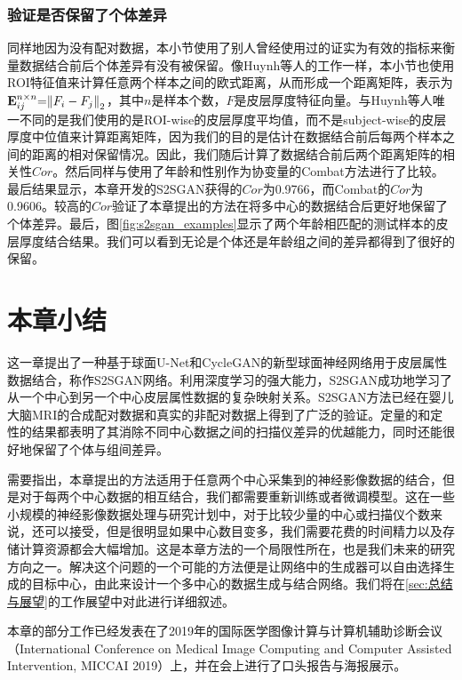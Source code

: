 \subsubsection{验证是否保留了个体差异}
同样地因为没有配对数据，本小节使用了别人曾经使用过的证实为有效的指标来衡量数据结合前后个体差异有没有被保留。像Huynh等人\cite{huynh2019multi}的工作一样，本小节也使用ROI特征值来计算任意两个样本之间的欧式距离，从而形成一个距离矩阵，表示为${\bf{E}}_{ij}^{n \times n}{\rm{ = }}{\left\| {{F_i} - {F_j}} \right\|_{\rm{2}}}$，其中$n$是样本个数，$F$是皮层厚度特征向量。与Huynh等人\cite{huynh2019multi}唯一不同的是我们使用的是ROI-wise的皮层厚度平均值，而不是subject-wise的皮层厚度中位值来计算距离矩阵，因为我们的目的是估计在数据结合前后每两个样本之间的距离的相对保留情况。因此，我们随后计算了数据结合前后两个距离矩阵的相关性$Cor$。然后同样与使用了年龄和性别作为协变量的Combat方法进行了比较。最后结果显示，本章开发的S2SGAN获得的$Cor$为0.9766，而Combat的$Cor$为0.9606。较高的$Cor$验证了本章提出的方法在将多中心的数据结合后更好地保留了个体差异。最后，图\ref{fig:s2sgan_examples}显示了两个年龄相匹配的测试样本的皮层厚度结合结果。我们可以看到无论是个体还是年龄组之间的差异都得到了很好的保留。

\section{本章小结}
这一章提出了一种基于球面U-Net和CycleGAN的新型球面神经网络用于皮层属性数据结合，称作S2SGAN网络。利用深度学习的强大能力，S2SGAN成功地学习了从一个中心到另一个中心皮层属性数据的复杂映射关系。S2SGAN方法已经在婴儿大脑MRI的合成配对数据和真实的非配对数据上得到了广泛的验证。定量的和定性的结果都表明了其消除不同中心数据之间的扫描仪差异的优越能力，同时还能很好地保留了个体与组间差异。

需要指出，本章提出的方法适用于任意两个中心采集到的神经影像数据的结合，但是对于每两个中心数据的相互结合，我们都需要重新训练或者微调模型。这在一些小规模的神经影像数据处理与研究计划中，对于比较少量的中心或扫描仪个数来说，还可以接受，但是很明显如果中心数目变多，我们需要花费的时间精力以及存储计算资源都会大幅增加。这是本章方法的一个局限性所在，也是我们未来的研究方向之一。解决这个问题的一个可能的方法便是让网络中的生成器可以自由选择生成的目标中心，由此来设计一个多中心的数据生成与结合网络。我们将在\ref{sec:总结与展望}的工作展望中对此进行详细叙述。

%
        {
        }
        {
        本章的部分工作已经发表在了2019年的国际医学图像计算与计算机辅助诊断会议（International Conference on Medical Image Computing and Computer Assisted Intervention, MICCAI 2019）上，并在会上进行了口头报告与海报展示。
        }
        





